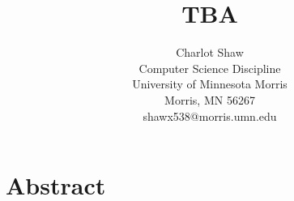 \documentclass[12pt]{article}
\newcommand{\comment}[1]{{\bf \tt  {#1}}}
\begin{document}
\pagestyle{plain}
%

\title{TBA}
%
%

\author{
Charlot Shaw \\
Computer Science Discipline \\
University of Minnesota Morris\\
Morris, MN 56267\\
shawx538@morris.umn.edu
}
\maketitle
\thispagestyle{empty}

\section*{\centering Abstract}


\newpage
\setcounter{page}{1}
\end{document}
